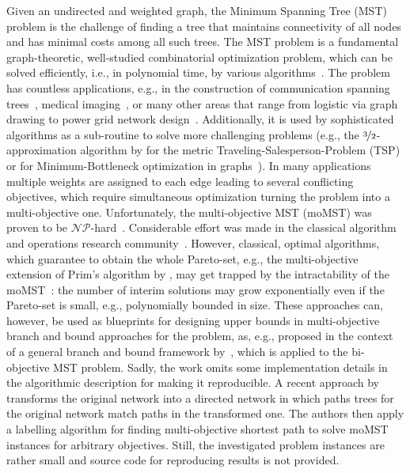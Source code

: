 \documentclass[twoside]{article}
\begin{document}
Given an undirected and weighted graph, the Minimum Spanning Tree (MST) problem is the challenge of finding a tree that maintains connectivity of all nodes and has minimal costs among all such trees. The MST problem is a fundamental graph-theoretic, well-studied combinatorial optimization problem, which can be solved efficiently, i.e., in polynomial time, by various algorithms~\citep{Prim57,Kr56}. The problem has countless applications, e.g., in the construction of communication spanning trees~\citep{hu1974}, medical imaging~\citep{An2000}, or many other areas that range from logistic via graph drawing to power grid network design~\citep{Atallah2009}. Additionally, it is used by sophisticated algorithms as a sub-routine to solve more challenging problems (e.g., the $\nicefrac{3}{2}$-approximation algorithm by \citet{Christofides76} for the metric Traveling-Salesperson-Problem (TSP) or for Minimum-Bottleneck optimization in graphs~\citep{Gabow1988BST}).
In many applications multiple weights are assigned to each edge leading to several conflicting objectives, which require simultaneous optimization turning the problem into a multi-objective one. Unfortunately, the multi-objective MST (moMST) was proven to be $\mathcal{NP}$-hard~\citep{CGM83}. Considerable effort was made in the classical algorithm and operations research community~\citep{Ehrgott2005,RH09}. However, classical, optimal algorithms, which guarantee to obtain the whole Pareto-set, e.g., the multi-objective extension of Prim's algorithm by \citet{Corley1985}, may get trapped by the intractability of the moMST~\citep{Hamacher1994}: the number of interim solutions may grow exponentially even if the Pareto-set is small, e.g., polynomially bounded in size. These approaches can, however, be used as blueprints for designing upper bounds in multi-objective branch and bound approaches for the problem, as, e.g., proposed in the context of a general branch and bound framework by~\citet{SourdS2008}, which is applied to the bi-objective MST problem. Sadly, the  work omits some implementation details in the algorithmic description for making it reproducible.
A recent approach by \citet{santos2018} transforms the original network into a directed network in which paths trees for the original network match paths in the transformed one. The authors then apply a labelling algorithm for finding multi-objective shortest path to solve moMST instances for arbitrary objectives. Still, the investigated problem instances are rather small and source code for reproducing results is not provided.
\end{document}

